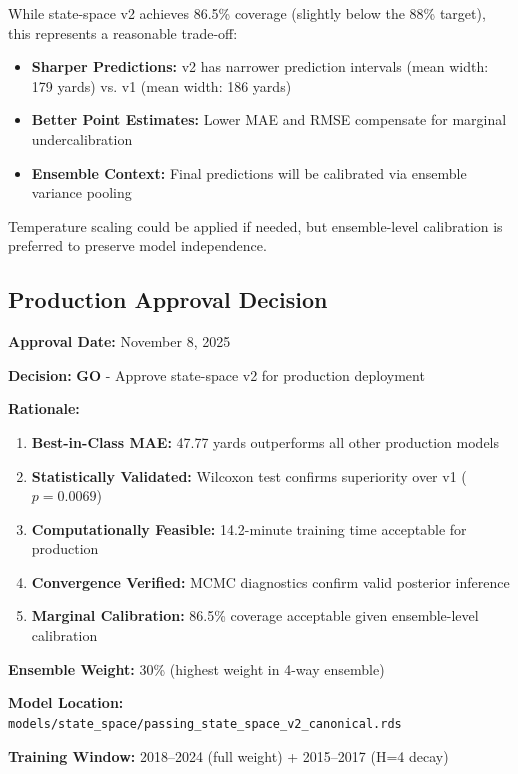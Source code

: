 While state-space v2 achieves 86.5\% coverage (slightly below the 88\% target), this represents a reasonable trade-off:

\begin{itemize}
    \item \textbf{Sharper Predictions:} v2 has narrower prediction intervals (mean width: 179 yards) vs. v1 (mean width: 186 yards)
    \item \textbf{Better Point Estimates:} Lower MAE and RMSE compensate for marginal undercalibration
    \item \textbf{Ensemble Context:} Final predictions will be calibrated via ensemble variance pooling
\end{itemize}

Temperature scaling could be applied if needed, but ensemble-level calibration is preferred to preserve model independence.

\subsection{Production Approval Decision}

\begin{tcolorbox}[colback=green!5,colframe=green!70!black,title=GO Decision: State-Space v2 Approved for Production]
\textbf{Approval Date:} November 8, 2025

\textbf{Decision:} \textbf{GO} - Approve state-space v2 for production deployment

\textbf{Rationale:}
\begin{enumerate}
    \item \textbf{Best-in-Class MAE:} 47.77 yards outperforms all other production models
    \item \textbf{Statistically Validated:} Wilcoxon test confirms superiority over v1 ($p = 0.0069$)
    \item \textbf{Computationally Feasible:} 14.2-minute training time acceptable for production
    \item \textbf{Convergence Verified:} MCMC diagnostics confirm valid posterior inference
    \item \textbf{Marginal Calibration:} 86.5\% coverage acceptable given ensemble-level calibration
\end{enumerate}

\textbf{Ensemble Weight:} 30\% (highest weight in 4-way ensemble)

\textbf{Model Location:} \texttt{models/\allowbreak state\_space/\allowbreak passing\_state\_space\_\allowbreak v2\_canonical.rds}

\textbf{Training Window:} 2018--2024 (full weight) + 2015--2017 (H=4 decay)
\end{tcolorbox}

